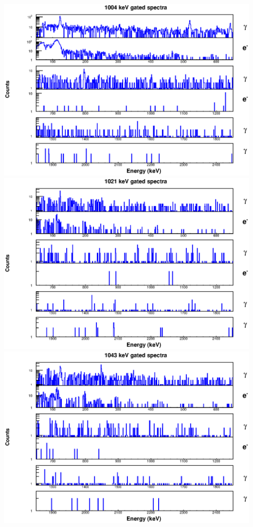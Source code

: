 \begin{landscape}
\includegraphics[scale=1.1]{154Gd_Appendix/1004_combined.eps}
\includegraphics[scale=1.1]{154Gd_Appendix/1021_combined.eps}
\includegraphics[scale=1.1]{154Gd_Appendix/1043_combined.eps}

\end{landscape}

